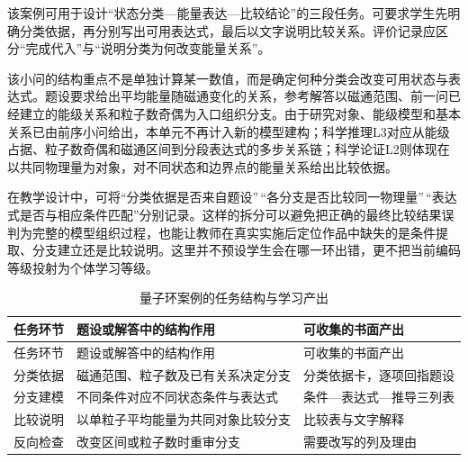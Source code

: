 \documentclass[
  12pt,
  a4paper,twoside,openany]{ctexbook}
\begin{document}
该案例可用于设计``状态分类---能量表达---比较结论''的三段任务。可要求学生先明确分类依据，再分别写出可用表达式，最后以文字说明比较关系。评价记录应区分``完成代入''与``说明分类为何改变能量关系''。

该小问的结构重点不是单独计算某一数值，而是确定何种分类会改变可用状态与表达式。题设要求给出平均能量随磁通变化的关系，参考解答以磁通范围、前一问已经建立的能级关系和粒子数奇偶为入口组织分支。由于研究对象、能级模型和基本关系已由前序小问给出，本单元不再计入新的模型建构；科学推理L3对应从能级占据、粒子数奇偶和磁通区间到分段表达式的多步关系链；科学论证L2则体现在以共同物理量为对象，对不同状态和边界点的能量关系给出比较依据。

在教学设计中，可将``分类依据是否来自题设''\,``各分支是否比较同一物理量''\,``表达式是否与相应条件匹配''分别记录。这样的拆分可以避免把正确的最终比较结果误判为完整的模型组织过程，也能让教师在真实实施后定位作品中缺失的是条件提取、分支建立还是比较说明。这里并不预设学生会在哪一环出错，更不把当前编码等级投射为个体学习等级。

\begin{longtable}[]{@{}
  >{\raggedright\arraybackslash}p{}
  >{\raggedright\arraybackslash}p{}
  >{\raggedright\arraybackslash}p{}@{}}
\caption{量子环案例的任务结构与学习产出}\tabularnewline
\toprule\noalign{}
\rowcolor{ThesisPale}
\begin{minipage}[b]{\linewidth}\raggedright
任务环节
\end{minipage} & \begin{minipage}[b]{\linewidth}\raggedright
题设或解答中的结构作用
\end{minipage} & \begin{minipage}[b]{\linewidth}\raggedright
可收集的书面产出
\end{minipage} \\
\midrule\noalign{}
\endfirsthead
\toprule\noalign{}
\rowcolor{ThesisPale}
\begin{minipage}[b]{\linewidth}\raggedright
任务环节
\end{minipage} & \begin{minipage}[b]{\linewidth}\raggedright
题设或解答中的结构作用
\end{minipage} & \begin{minipage}[b]{\linewidth}\raggedright
可收集的书面产出
\end{minipage} \\
\midrule\noalign{}
\endhead
\bottomrule\noalign{}
\endlastfoot
分类依据 & 磁通范围、粒子数及已有关系决定分支 &
分类依据卡，逐项回指题设 \\
分支建模 & 不同条件对应不同状态条件与表达式 &
条件---表达式---推导三列表 \\
比较说明 & 以单粒子平均能量为共同对象比较分支 & 比较表与文字解释 \\
反向检查 & 改变区间或粒子数时重审分支 & 需要改写的列及理由 \\
\end{longtable}
\end{document}
